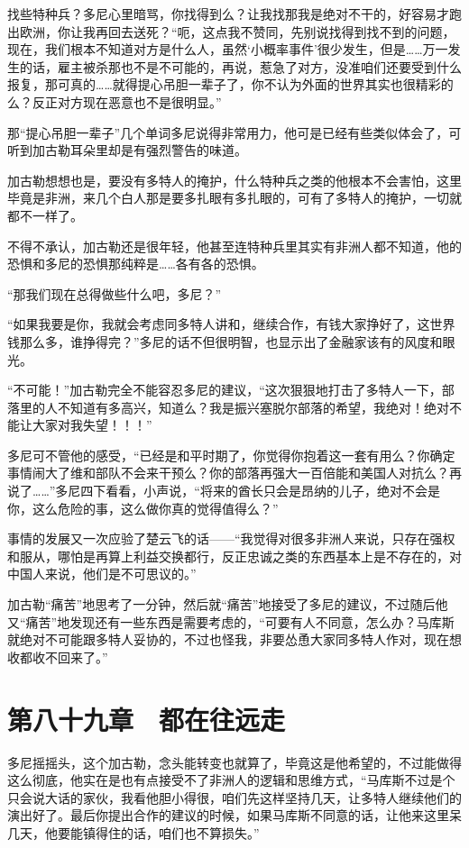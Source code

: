 找些特种兵？多尼心里暗骂，你找得到么？让我找那我是绝对不干的，好容易才跑出欧洲，你让我再回去送死？“呃，这点我不赞同，先别说找得到找不到的问题，现在，我们根本不知道对方是什么人，虽然‘小概率事件’很少发生，但是……万一发生的话，雇主被杀那也不是不可能的，再说，惹急了对方，没准咱们还要受到什么报复，那可真的……就得提心吊胆一辈子了，你不认为外面的世界其实也很精彩的么？反正对方现在恶意也不是很明显。”

那“提心吊胆一辈子”几个单词多尼说得非常用力，他可是已经有些类似体会了，可听到加古勒耳朵里却是有强烈警告的味道。

加古勒想想也是，要没有多特人的掩护，什么特种兵之类的他根本不会害怕，这里毕竟是非洲，来几个白人那是要多扎眼有多扎眼的，可有了多特人的掩护，一切就都不一样了。

不得不承认，加古勒还是很年轻，他甚至连特种兵里其实有非洲人都不知道，他的恐惧和多尼的恐惧那纯粹是……各有各的恐惧。

“那我们现在总得做些什么吧，多尼？”

“如果我要是你，我就会考虑同多特人讲和，继续合作，有钱大家挣好了，这世界钱那么多，谁挣得完？”多尼的话不但很明智，也显示出了金融家该有的风度和眼光。

“不可能！”加古勒完全不能容忍多尼的建议，“这次狠狠地打击了多特人一下，部落里的人不知道有多高兴，知道么？我是振兴塞脱尔部落的希望，我绝对！绝对不能让大家对我失望！！！”

多尼可不管他的感受，“已经是和平时期了，你觉得你抱着这一套有用么？你确定事情闹大了维和部队不会来干预么？你的部落再强大一百倍能和美国人对抗么？再说了……”多尼四下看看，小声说，“将来的酋长只会是昂纳的儿子，绝对不会是你，这么危险的事，这么做你真的觉得值得么？”

事情的发展又一次应验了楚云飞的话——“我觉得对很多非洲人来说，只存在强权和服从，哪怕是再算上利益交换都行，反正忠诚之类的东西基本上是不存在的，对中国人来说，他们是不可思议的。”

加古勒“痛苦”地思考了一分钟，然后就“痛苦”地接受了多尼的建议，不过随后他又“痛苦”地发现还有一些东西是需要考虑的，“可要有人不同意，怎么办？马库斯就绝对不可能跟多特人妥协的，不过也怪我，非要怂恿大家同多特人作对，现在想收都收不回来了。”

\section{第八十九章　都在往远走}

多尼摇摇头，这个加古勒，念头能转变也就算了，毕竟这是他希望的，不过能做得这么彻底，他实在是也有点接受不了非洲人的逻辑和思维方式，“马库斯不过是个只会说大话的家伙，我看他胆小得很，咱们先这样坚持几天，让多特人继续他们的演出好了。最后你提出合作的建议的时候，如果马库斯不同意的话，让他来这里呆几天，他要能镇得住的话，咱们也不算损失。”

